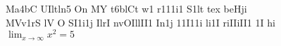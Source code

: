 \documentclass{article}%
\begin{document}
%
\normalsize%
Ma4bC UIltln5 On MY t6blCt w1 r111i1 S1lt tex beHji\\
MVv1rS lV O SI1i1j IlrI nvOIllII1 In1j 11I11i li1I riIIiII1 1I hi\\
$\lim_{x \rightarrow \infty} x^{2} = 5$\\%
\end{document}
